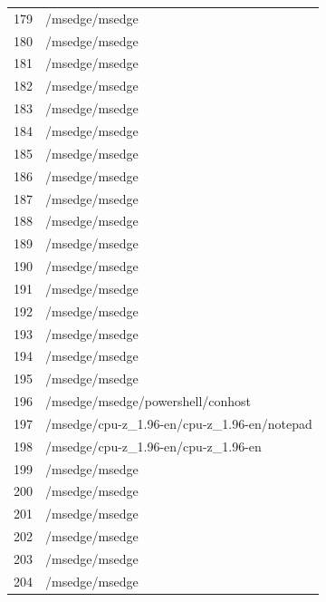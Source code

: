 \documentclass[a4paper,twoside,12pt]{book}
\begin{document}
\begin{appendices}
\begin{table}
\begin{tabular}{ll}
		179 &                                     /msedge/msedge \\
		180 &                                     /msedge/msedge \\
		181 &                                     /msedge/msedge \\
		182 &                                     /msedge/msedge \\
		183 &                                     /msedge/msedge \\
		184 &                                     /msedge/msedge \\
		185 &                                     /msedge/msedge \\
		186 &                                     /msedge/msedge \\
		187 &                                     /msedge/msedge \\
		188 &                                     /msedge/msedge \\
		189 &                                     /msedge/msedge \\
		190 &                                     /msedge/msedge \\
		191 &                                     /msedge/msedge \\
		192 &                                     /msedge/msedge \\
		193 &                                     /msedge/msedge \\
		194 &                                     /msedge/msedge \\
		195 &                                     /msedge/msedge \\
		196 &                  /msedge/msedge/powershell/conhost \\
		197 &        /msedge/cpu-z\_1.96-en/cpu-z\_1.96-en/notepad \\
		198 &                /msedge/cpu-z\_1.96-en/cpu-z\_1.96-en \\
		199 &                                     /msedge/msedge \\
		200 &                                     /msedge/msedge \\
		201 &                                     /msedge/msedge \\
		202 &                                     /msedge/msedge \\
		203 &                                     /msedge/msedge \\
		204 &                                     /msedge/msedge \\

\end{tabular}
\end{table}
\end{appendices}
\end{document}
